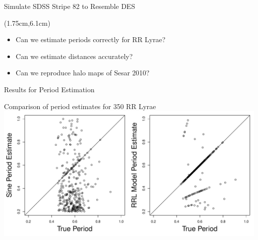 \documentclass[12pt]{beamer}
\begin{document}
\begin{frame}{Simulate SDSS Stripe 82 to Resemble DES}
  \begin{textblock*}{12cm}(1.75cm,6.1cm) %
\begin{itemize}
\item Can we estimate periods correctly for RR Lyrae?
\item Can we estimate distances accurately?
\item Can we reproduce halo maps of Sesar 2010?
\end{itemize}
\end{textblock*}

\end{frame}


\begin{frame}{Results for Period Estimation}



\begin{center}
Comparison of period estimates for 350 RR Lyrae\\
\includegraphics[scale=.4]{figs/period_est_comparison.pdf}
\end{center}


\end{frame}
\end{document}
